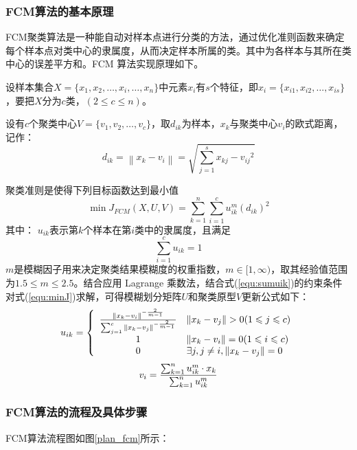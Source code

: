 \subsubsection{FCM算法的基本原理}
FCM聚类算法是一种能自动对样本点进行分类的方法，通过优化准则函数来确定每个样本点对类中心的隶属度，从而决定样本所属的类。其中为各样本与其所在类中心的误差平方和。FCM 算法实现原理如下。

设样本集合$X = \{ x_1,x_2,\dots,x_i,\dots,x_n \}$中元素$x_i$有$s$个特征，即$x_i = \{ x_{i1},x_{i2},\dots,x_{is} \}$，要把$X$分为$c$类，$(2\leqslant c\leqslant n)$。

设有$c$个聚类中心$V = \{ v_1,v_2,\dots,v_c \}$，取$d_{ik}$为样本，$x_k$与聚类中心$v_i$的欧式距离，记作：
\begin{equation}
	d_{ik} = \left\| x_k-v_i \right\|  = \sqrt{\sum_{j=1}^{s}{x_{kj}-v_{ij}}^2}
\end{equation}

聚类准则是使得下列目标函数达到最小值
\begin{equation}
\label{equ:minJ}
	\min J_{FCM}(X,U,V) = \sum_{k=1}^{n}\sum_{i=1}^{c} u_{ik}^m{(d_{ik})}^2
\end{equation}
其中： $u_{ik}$表示第$k$个样本在第$i$类中的隶属度，且满足
\begin{equation}
\label{equ:sumuik}
	\sum_{i=1}^{c} u_{ik} = 1
\end{equation}
$m$是模糊因子用来决定聚类结果模糊度的权重指数，$m\in [1,\infty)$，取其经验值范围为$1.5\leqslant m\leqslant 2.5$。结合应用 Lagrange 乘数法，结合式(\ref{equ:sumuik})的约束条件对式(\ref{equ:minJ})求解，可得模糊划分矩阵$U$和聚类原型$V$更新公式如下：
\begin{equation}
\label{equ:uik}
	u_{ik} = \left\lbrace 
				\begin{array}{cl}
				{{\left\| x_k-v_i \right\|}^{-{2\over m-1}}
					\over 
				\sum_{j=1}^{c}{\left\| x_k-v_j \right\|}^{-{2\over m-1}}	}& \left\| x_k-v_j \right\| > 0(1\leqslant j\leqslant c)\\
				1& \left\| x_k-v_i \right\| = 0(1\leqslant i\leqslant c) \\
				0& \exists j,j\neq i,\left\| x_k-v_j \right\| = 0
				\end{array}
				 \right. 
\end{equation}
\begin{equation}
\label{equ:vi}
	v_i = {\sum_{k=1}^{n} u_{ik}^m \cdot x_k
			\over 
			\sum_{k=1}^{n} u_{ik}^m }
\end{equation}

\subsubsection{FCM算法的流程及具体步骤}
FCM算法流程图如图\ref{plan_fcm}所示：

